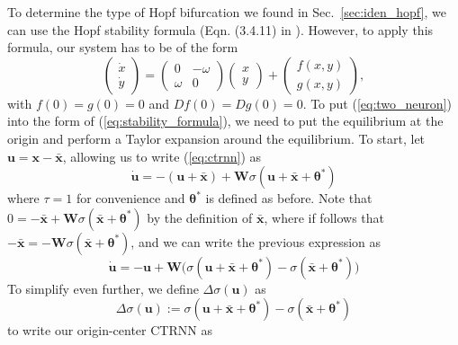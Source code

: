\documentclass[11pt, letterpaper]{article}
\begin{document}
To determine the type of Hopf bifurcation we found in Sec.~\ref{sec:iden_hopf}, we can use the Hopf stability formula (Eqn. (3.4.11) in \citet{guckenhiemerholmes}). However, to apply this formula, our system has to be of the form
\begin{equation}\label{eq:stability_formula}
    \begin{pmatrix}
        \dot{x}\\\dot{y}
    \end{pmatrix}=\begin{pmatrix}
        0 & -\omega\\
        \omega & 0
    \end{pmatrix}\begin{pmatrix}
        x \\ y
    \end{pmatrix} + \begin{pmatrix}
        f(x,y)\\g(x,y)
    \end{pmatrix},
\end{equation}
with $f(0)=g(0)=0$ and $Df(0)=Dg(0)=0$. To put (\ref{eq:two_neuron}) into the form of (\ref{eq:stability_formula}), we need to put the equilibrium at the origin and perform a Taylor expansion around the equilibrium. To start, let $\mathbf{u}=\mathbf{x}-\bar{\mathbf{x}}$, allowing us to write (\ref{eq:ctrnn}) as
\begin{equation*}
    \dot{\mathbf{u}}=-\left(\mathbf{u}+\bar{\mathbf{x}}\right) + \mathbf{W}\sigma\left( \mathbf{u}+\bar{\mathbf{x}} + \mathbf{\theta}^\ast \right)
\end{equation*}
where $\tau=1$ for convenience and $\mathbf{\theta}^\ast$ is defined as before. Note that $0=-\bar{\mathbf{x}}+ \mathbf{W}\sigma\left( \bar{\mathbf{x}} + \mathbf{\theta}^\ast \right)$ by the definition of $\bar{\mathbf{x}}$, where if follows that $-\bar{\mathbf{x}}=-\mathbf{W}\sigma\left( \bar{\mathbf{x}} + \mathbf{\theta}^\ast \right)$, and we can write the previous expression as 
\begin{equation*}
    \dot{\mathbf{u}} = -\mathbf{u}+\mathbf{W}\big( \sigma\left( \mathbf{u}+\bar{\mathbf{x}} + \mathbf{\theta}^\ast \right) - \sigma\left( \bar{\mathbf{x}} + \mathbf{\theta}^\ast \right) \big)
\end{equation*}
To simplify even further, we define $\Delta\sigma(\mathbf{u})$ as
\[
\Delta\sigma(\mathbf{u}) := \sigma\left( \mathbf{u}+\bar{\mathbf{x}} + \mathbf{\theta}^\ast \right) - \sigma\left( \bar{\mathbf{x}} + \mathbf{\theta}^\ast \right) 
\]
to write our origin-center CTRNN as 
\end{document}

